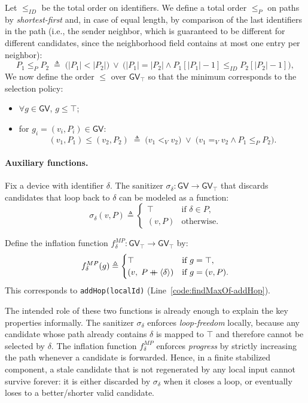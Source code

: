 \documentclass[runningheads]{llncs}
\newcommand{\seq}[1]{\langle #1 \rangle}      %
\newcommand{\concat}{\mathbin{+\mkern-10mu+}} %
\begin{document}
Let $\le_{ID}$ be the total order on identifiers.
We define a total order $\le_P$ on paths by \emph{shortest-first} and, in case of equal length,
by comparison of the last identifiers in the path
(i.e., the sender neighbor, which is guaranteed to be different for different candidates,
since the neighborhood field contains at most one entry per neighbor):
\[
    P_1 \le_P P_2
    \;\triangleq\;
    \big(|P_1|<|P_2|\big)
    \ \lor\
    \big(|P_1|=|P_2| \land P_1\left[|P_1|-1\right] \le_{ID} P_2\left[|P_2|-1\right]\big),
\]
We now define the order $\le$ over $\mathsf{GV}_\top$ so that the minimum corresponds to the selection policy:
\begin{itemize}
    \item $\forall g\in\mathsf{GV}$, $g \le \top$;
    \item for $g_i=(v_i,P_i)\in\mathsf{GV}$:
    \[
        (v_1,P_1) \le (v_2,P_2)
        \;\triangleq\;
        \big(v_1 <_V v_2\big)
        \;\lor\;
        \big(v_1 =_V v_2 \land P_1 \le_P P_2\big).
    \]
\end{itemize}

\paragraph{Auxiliary functions.}

Fix a device with identifier $\delta$.
The sanitizer $\sigma_\delta:\mathsf{GV}\to\mathsf{GV}_\top$
that discards candidates that loop back to $\delta$ can be modeled as a function:
\[
    \sigma_\delta(v,P) \triangleq
    \begin{cases}
        \top & \text{if }\delta\in P,\\
        (v,P) & \text{otherwise}.
    \end{cases}
\]

Define the inflation function $f^{MP}_\delta:\mathsf{GV}_\top\to\mathsf{GV}_\top$ by:
\[
    f^{MP}_\delta(g) \triangleq
    \begin{cases}
        \top & \text{if } g=\top,\\
        (v,\; P \concat \seq{\delta}) & \text{if } g=(v,P).
    \end{cases}
\]
This corresponds to \lstinline|addHop(localId)| (Line~\ref{code:findMaxOf-addHop}).

The intended role of these two functions is already enough to explain the key properties informally.
%
The sanitizer $\sigma_\delta$ enforces \emph{loop-freedom} locally,
because any candidate whose path already contains $\delta$ is mapped to $\top$ and therefore cannot be selected by $\delta$.
%
The inflation function $f^{MP}_\delta$ enforces \emph{progress} by strictly increasing the path whenever a candidate is forwarded.
%
Hence, in a finite stabilized component,
a stale candidate that is not regenerated by any local input cannot survive forever:
it is either discarded by $\sigma_\delta$ when it closes a loop, or eventually loses to a better/shorter valid candidate.
\end{document}
